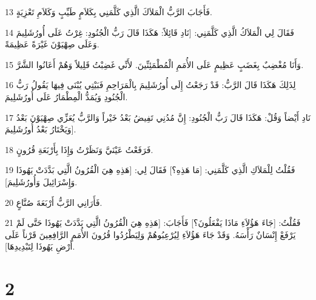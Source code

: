 \par 13 فَأَجَابَ الرَّبُّ الْمَلاَكَ الَّذِي كَلَّمَنِي بِكَلاَمٍ طَيِّبٍ وَكَلاَمِ تَعْزِيَةٍ.
\par 14 فَقَالَ لِي الْمَلاَكُ الَّذِي كَلَّمَنِي: [نَادِ قَائِلاً: هَكَذَا قَالَ رَبُّ الْجُنُودِ: غِرْتُ عَلَى أُورُشَلِيمَ وَعَلَى صِهْيَوْنَ غَيْرَةً عَظِيمَةً.
\par 15 وَأَنَا مُغْضِبٌ بِغَضَبٍ عَظِيمٍ عَلَى الأُمَمِ الْمُطْمَئِنِّينَ. لأَنِّي غَضِبْتُ قَلِيلاً وَهُمْ أَعَانُوا الشَّرَّ.
\par 16 لِذَلِكَ هَكَذَا قَالَ الرَّبُّ: قَدْ رَجَعْتُ إِلَى أُورُشَلِيمَ بِالْمَرَاحِمِ فَبَيْتِي يُبْنَى فِيهَا يَقُولُ رَبُّ الْجُنُودِ وَيُمَدُّ الْمِطْمَارُ عَلَى أُورُشَلِيمَ.
\par 17 نَادِ أَيْضاً وَقُلْ: هَكَذَا قَالَ رَبُّ الْجُنُودِ: إِنَّ مُدُنِي تَفِيضُ بَعْدُ خَيْراً وَالرَّبُّ يُعَزِّي صِهْيَوْنَ بَعْدُ وَيَخْتَارُ بَعْدُ أُورُشَلِيمَ].
\par 18 فَرَفَعْتُ عَيْنَيَّ وَنَظَرْتُ وَإِذَا بِأَرْبَعَةِ قُرُونٍ.
\par 19 فَقُلْتُ لِلْمَلاَكِ الَّذِي كَلَّمَنِي: [مَا هَذِهِ؟] فَقَالَ لِي: [هَذِهِ هِيَ الْقُرُونُ الَّتِي بَدَّدَتْ يَهُوذَا وَإِسْرَائِيلَ وَأُورُشَلِيمَ].
\par 20 فَأَرَانِي الرَّبُّ أَرْبَعَةَ صُنَّاعٍ.
\par 21 فَقُلْتُ: [جَاءَ هَؤُلاَءِ مَاذَا يَفْعَلُونَ؟] فَأَجَابَ: [هَذِهِ هِيَ الْقُرُونُ الَّتِي بَدَّدَتْ يَهُوذَا حَتَّى لَمْ يَرْفَعْ إِنْسَانٌ رَأْسَهُ. وَقَدْ جَاءَ هَؤُلاَءِ لِيُرْعِبُوهُمْ وَلِيَطْرُدُوا قُرُونَ الأُمَمِ الرَّافِعِينَ قَرْناً عَلَى أَرْضِ يَهُوذَا لِتَبْدِيدِهَا].

\chapter{2}

